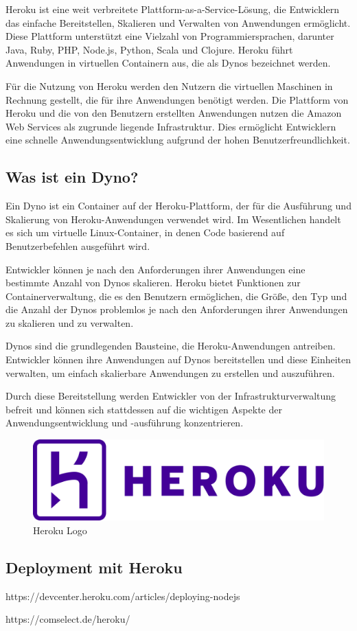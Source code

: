 Heroku ist eine weit verbreitete Plattform-as-a-Service-Lösung, die Entwicklern das einfache Bereitstellen, Skalieren und Verwalten von Anwendungen ermöglicht. Diese Plattform unterstützt eine Vielzahl von Programmiersprachen, darunter Java, Ruby, PHP, Node.js, Python, Scala und Clojure. Heroku führt Anwendungen in virtuellen Containern aus, die als Dynos bezeichnet werden.

Für die Nutzung von Heroku werden den Nutzern die virtuellen Maschinen in Rechnung gestellt, die für ihre Anwendungen benötigt werden. Die Plattform von Heroku und die von den Benutzern erstellten Anwendungen nutzen die Amazon Web Services als zugrunde liegende Infrastruktur. Dies ermöglicht Entwicklern eine schnelle Anwendungsentwicklung aufgrund der hohen Benutzerfreundlichkeit.

\subsection{Was ist ein Dyno?}

Ein Dyno ist ein Container auf der Heroku-Plattform, der für die Ausführung und Skalierung von Heroku-Anwendungen verwendet wird. Im Wesentlichen handelt es sich um virtuelle Linux-Container, in denen Code basierend auf Benutzerbefehlen ausgeführt wird.

Entwickler können je nach den Anforderungen ihrer Anwendungen eine bestimmte Anzahl von Dynos skalieren. Heroku bietet Funktionen zur Containerverwaltung, die es den Benutzern ermöglichen, die Größe, den Typ und die Anzahl der Dynos problemlos je nach den Anforderungen ihrer Anwendungen zu skalieren und zu verwalten.

Dynos sind die grundlegenden Bausteine, die Heroku-Anwendungen antreiben. Entwickler können ihre Anwendungen auf Dynos bereitstellen und diese Einheiten verwalten, um einfach skalierbare Anwendungen zu erstellen und auszuführen.

Durch diese Bereitstellung werden Entwickler von der Infrastrukturverwaltung befreit und können sich stattdessen auf die wichtigen Aspekte der Anwendungsentwicklung und -ausführung konzentrieren.

\begin{figure}[h!]
    \centering
    \includegraphics[width=0.7\linewidth]{pics/heroku.png}
    \caption{Heroku Logo}
    \label{fig:enter-label}
\end{figure}

\subsection{Deployment mit Heroku}

https://devcenter.heroku.com/articles/deploying-nodejs

https://comselect.de/heroku/